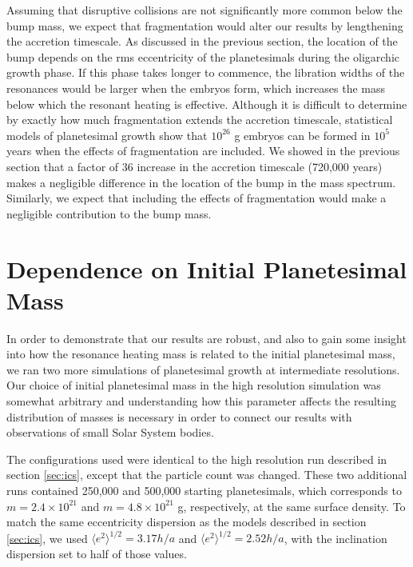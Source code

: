 Assuming that disruptive collisions are not significantly more common below the bump mass, we expect that fragmentation 
would alter our results by lengthening the accretion timescale. As discussed in the previous section, the location of the bump 
depends on the rms eccentricity of the planetesimals during the oligarchic growth phase. If this phase takes longer to 
commence, the libration widths of the resonances would be larger when the embryos form, which increases the mass below 
which the resonant heating is effective. Although it is difficult to determine by exactly how much fragmentation extends the 
accretion timescale, statistical models of planetesimal growth show that $10^{26}$ g embryos can be formed in $10^{5}$ years 
\cite{wetherill93} when the effects of fragmentation are included. We showed in the previous section that a factor of 36 increase 
in the accretion timescale (720,000 years) makes a negligible difference in the location of the bump in the mass spectrum. 
Similarly, we expect that including the effects of fragmentation would make a negligible contribution to the bump mass.

\section{Dependence on Initial Planetesimal Mass}\label{sec:intermed}

In order to demonstrate that our results are robust, and also to gain some insight into how the resonance heating mass is related 
to the initial planetesimal mass, we ran two more simulations of planetesimal growth at intermediate resolutions. Our choice of 
initial planetesimal mass in the high resolution simulation was somewhat arbitrary and understanding how this parameter affects 
the resulting distribution of masses is necessary in order to connect our results with observations of small Solar System bodies.

The configurations used were identical to the high resolution run described in section \ref{sec:ics}, except that the particle count 
was changed. These two additional runs contained 250,000 and 500,000 starting planetesimals, which corresponds to $m = 2.4 
\times 10^{21}$ and $m = 4.8 \times 10^{21}$ g, respectively, at the same surface density. To match the same eccentricity 
dispersion as the models described in section \ref{sec:ics}, we used $\langle e^2 \rangle^{1/2} = 3.17 h/a$ and $\langle e^2 
\rangle^{1/2} = 2.52 h/a$, with the inclination dispersion set to half of those values.

